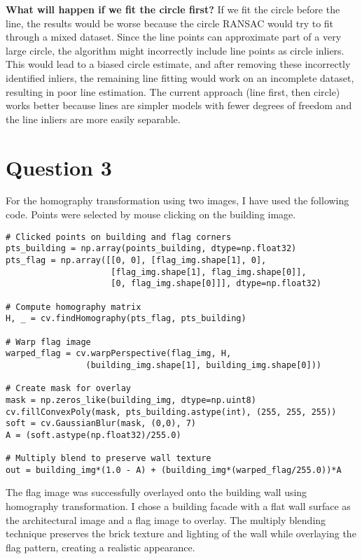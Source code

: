 \documentclass[11pt,a4paper]{article}
\begin{document}
\textbf{What will happen if we fit the circle first?} If we fit the circle before the line, the results would be worse because the circle RANSAC would try to fit through a mixed dataset. Since the line points can approximate part of a very large circle, the algorithm might incorrectly include line points as circle inliers. This would lead to a biased circle estimate, and after removing these incorrectly identified inliers, the remaining line fitting would work on an incomplete dataset, resulting in poor line estimation. The current approach (line first, then circle) works better because lines are simpler models with fewer degrees of freedom and the line inliers are more easily separable.

\section*{Question 3}

For the homography transformation using two images, I have used the following code. Points were selected by mouse clicking on the building image.

\begin{lstlisting}
# Clicked points on building and flag corners
pts_building = np.array(points_building, dtype=np.float32)
pts_flag = np.array([[0, 0], [flag_img.shape[1], 0], 
                     [flag_img.shape[1], flag_img.shape[0]], 
                     [0, flag_img.shape[0]]], dtype=np.float32)

# Compute homography matrix
H, _ = cv.findHomography(pts_flag, pts_building)

# Warp flag image
warped_flag = cv.warpPerspective(flag_img, H,
                (building_img.shape[1], building_img.shape[0]))

# Create mask for overlay
mask = np.zeros_like(building_img, dtype=np.uint8)
cv.fillConvexPoly(mask, pts_building.astype(int), (255, 255, 255))
soft = cv.GaussianBlur(mask, (0,0), 7)
A = (soft.astype(np.float32)/255.0)

# Multiply blend to preserve wall texture
out = building_img*(1.0 - A) + (building_img*(warped_flag/255.0))*A
\end{lstlisting}

The flag image was successfully overlayed onto the building wall using homography transformation. I chose a building facade with a flat wall surface as the architectural image and a flag image to overlay. The multiply blending technique preserves the brick texture and lighting of the wall while overlaying the flag pattern, creating a realistic appearance.
\end{document}
